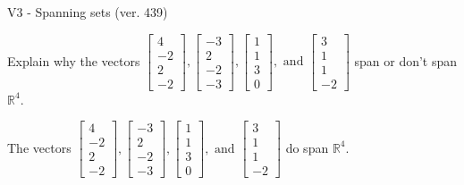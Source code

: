 \begin{exercise}
  \begin{exerciseTitle}V3 - Spanning sets (ver. 439)\end{exerciseTitle}
  \begin{exerciseStatement}
    Explain why the vectors \(\left[\begin{array}{r}
4 \\
-2 \\
2 \\
-2
\end{array}\right] , \left[\begin{array}{r}
-3 \\
2 \\
-2 \\
-3
\end{array}\right] , \left[\begin{array}{r}
1 \\
1 \\
3 \\
0
\end{array}\right] , \text{ and } \left[\begin{array}{r}
3 \\
1 \\
1 \\
-2
\end{array}\right]\) span or don't span \(\mathbb{R}^4\). 
	


  \end{exerciseStatement}
  \begin{exerciseAnswer}
   The vectors \(\left[\begin{array}{r}
4 \\
-2 \\
2 \\
-2
\end{array}\right] , \left[\begin{array}{r}
-3 \\
2 \\
-2 \\
-3
\end{array}\right] , \left[\begin{array}{r}
1 \\
1 \\
3 \\
0
\end{array}\right] , \text{ and } \left[\begin{array}{r}
3 \\
1 \\
1 \\
-2
\end{array}\right]\) 
  	 do  
	span \(\mathbb{R}^4\).
  


  \end{exerciseAnswer}
\end{exercise}